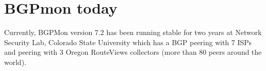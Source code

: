 \section{BGPmon today}
\label{sec:livedata}

Currently, BGPMon version 7.2 has been running stable for two years at Network Security Lab, Colorado State University which has a BGP peering with 7 ISPs and peering with 3 Oregon RouteViews collectors (more than 80 peers around the world).